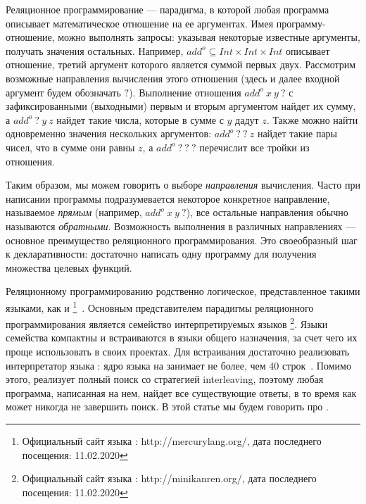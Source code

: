 \documentclass[conference]{IEEEtran}
\begin{document}
Реляционное программирование --- парадигма, в которой любая программа описывает математическое отношение на ее аргументах. 
Имея программу-отношение, можно выполнять запросы: указывая некоторые известные аргументы, получать значения остальных.
Например, $add^o \subseteq Int \times Int \times Int$ описывает отношение, третий аргумент которого является суммой первых двух. 
Рассмотрим возможные направления вычисления этого отношения (здесь и далее входной аргумент будем обозначать $?$).
Выполнение отношения $add^o  \ x \ y \ ?$ с зафиксированными (выходными) первым и вторым аргументом найдет их сумму, а $add^o \ ? \ y \ z$ найдет такие числа, которые в сумме с $y$ дадут $z$. 
Также можно найти одновременно значения нескольких аргументов: $add^o \ ? \ ? \ z$ найдет такие пары чисел, что в сумме они равны $z$, а $add^o \ ? \ ? \ ?$ перечислит все тройки из отношения. 

Таким образом, мы можем говорить о выборе \emph{направления} вычисления. 
Часто при написании программы подразумевается некоторое конкретное направление, называемое \emph{прямым} (например, $add^o  \ x \ y \ ?$), все остальные направления обычно называются \emph{обратными}. 
Возможность выполнения в различных направлениях --- основное преимущество реляционного программирования. 
Это своеобразный шаг к декларативности: достаточно написать одну программу для получения множества целевых функций. 

Реляционному программированию родственно логическое, представленное такими языками, как \prolog{} и \mercury{}\footnote{Официальный сайт языка \mercury{}: http://mercurylang.org/, дата последнего посещения: 11.02.2020}~\cite{SOMOGYI199617}.
Основным представителем парадигмы реляционного программирования является семейство интерпретируемых языков \miniKanren{}\footnote{Официальный сайт языка \miniKanren{}: http://minikanren.org/, дата последнего посещения: 11.02.2020}.
Языки семейства \miniKanren{} компактны и встраиваются в языки общего назначения, за счет чего их проще использовать в своих проектах. 
Для встраивания достаточно реализовать интерпретатор языка \miniKanren{}: ядро языка на \scheme{} занимает не более, чем 40 строк~\cite{hemann2013ukanren}.
Помимо этого, \miniKanren{} реализует полный поиск со стратегией interleaving, поэтому любая программа, написанная на нем, найдет все существующие ответы, в то время как \prolog{} может никогда не завершить поиск. 
В этой статье мы будем говорить про \miniKanren{}.
\end{document}
